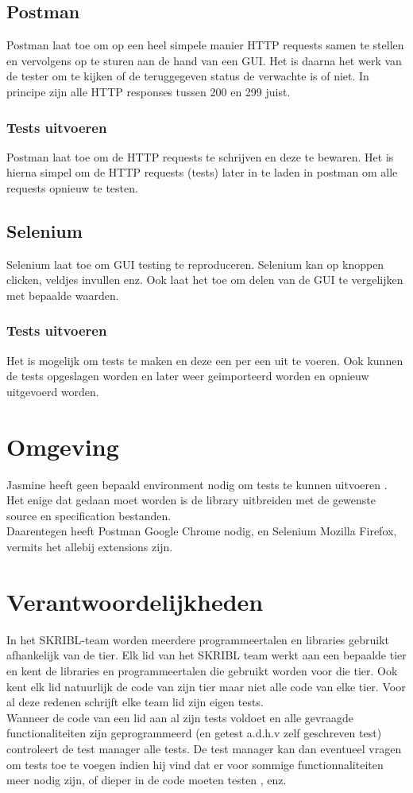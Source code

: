 \documentclass{article}
\begin{document}
\subsection{Postman}
Postman laat toe om op een heel simpele manier HTTP requests samen te stellen en vervolgens op te sturen aan de hand van een GUI. Het is daarna het werk van de tester om te kijken of de teruggegeven status de verwachte is of niet. In principe zijn alle HTTP responses tussen 200 en 299 juist.

\subsubsection{Tests uitvoeren}
Postman laat toe om de HTTP requests te schrijven en deze te bewaren. Het is hierna simpel om de HTTP requests (tests) later in te laden in postman om alle requests opnieuw te testen.

\subsection{Selenium}
Selenium laat toe om GUI testing te reproduceren. Selenium kan op knoppen clicken, veldjes invullen enz. Ook laat het toe om delen van de GUI te vergelijken met bepaalde waarden. 

\subsubsection{Tests uitvoeren}
Het is mogelijk om tests te maken en deze een per een uit te voeren. Ook kunnen de tests opgeslagen worden en later weer geimporteerd worden en opnieuw uitgevoerd worden. 

\section{Omgeving}
Jasmine heeft geen bepaald environment nodig om tests te kunnen uitvoeren . Het enige dat gedaan moet worden is de library uitbreiden met de gewenste source en specification bestanden.
\\
Daarentegen heeft Postman Google Chrome nodig, en Selenium Mozilla Firefox, vermits het allebij extensions zijn.

\section{Verantwoordelijkheden}
In het SKRIBL-team worden meerdere programmeertalen en libraries gebruikt afhankelijk van de tier. Elk lid van het SKRIBL team werkt aan een bepaalde tier en kent de libraries en programmeertalen die gebruikt worden voor die tier. Ook kent elk lid natuurlijk de code van zijn tier maar niet alle code van elke tier. Voor al deze redenen schrijft elke team lid zijn eigen tests.\\
Wanneer de code van een lid aan al zijn tests voldoet en alle gevraagde functionaliteiten zijn geprogrammeerd (en getest a.d.h.v zelf geschreven test) controleert de test manager alle tests. De test manager kan dan eventueel vragen om tests toe te voegen indien hij vind dat er voor sommige functionnaliteiten meer nodig zijn, of dieper in de code moeten testen , enz.
\end{document}

